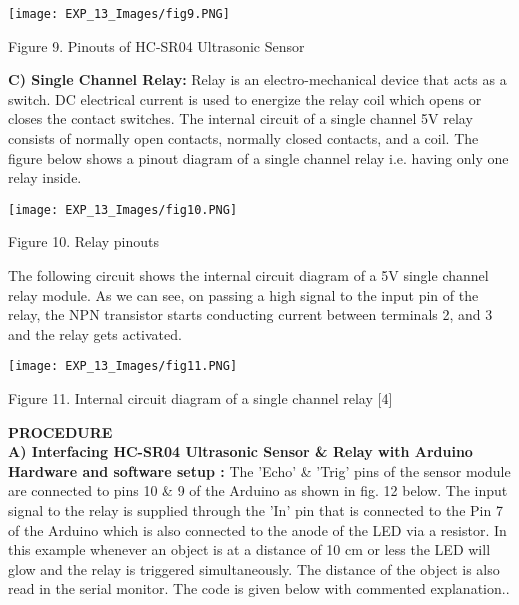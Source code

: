 \documentclass[12pt,a4paper]{article}
\begin{document}
\begin{justify}
\begin{center} 
\texttt{[image: EXP\_13\_Images/fig9.PNG]}
\end{center}
\begin{center} {Figure 9. Pinouts of HC-SR04 Ultrasonic Sensor}\end{center}

\noindent \textbf{C) Single Channel Relay:} Relay is an electro-mechanical device that acts as a switch. DC electrical current is used to energize the relay coil which opens or closes the contact switches. The internal circuit of a single channel 5V relay consists of normally open contacts, normally closed contacts, and a coil. The figure below shows a pinout diagram of a single channel relay i.e. having only one relay inside.


\begin{center} 
\texttt{[image: EXP\_13\_Images/fig10.PNG]}
\end{center}
\begin{center} {Figure 10. Relay pinouts}\end{center}

\noindent The following circuit shows the internal circuit diagram of a 5V single channel relay module. As we can see, on passing a high signal to the input pin of the relay, the NPN transistor starts conducting current between terminals 2, and 3 and the relay gets activated.

\begin{center} 
\texttt{[image: EXP\_13\_Images/fig11.PNG]}
\end{center}
\begin{center} {Figure 11. Internal circuit diagram of a single channel relay [4]}\end{center}

\noindent \textbf{\large PROCEDURE}\\[3pt]
\textbf{A) Interfacing HC-SR04 Ultrasonic Sensor \& Relay with Arduino }\\[3pt]
\textbf{Hardware and software setup :} The 'Echo' \& 'Trig' pins of the sensor module are connected to pins 10 \& 9 of the Arduino as shown in fig. 12 below. The input signal to the relay is supplied through the 'In' pin that is connected to the Pin 7 of the Arduino which is also connected to the anode of the LED via a resistor. In this example whenever an object is at a distance of 10 cm or less the LED will glow and the relay is triggered simultaneously. The distance of the object is also read in the serial monitor. The code is given below with commented explanation..\end{justify}
\end{document}
